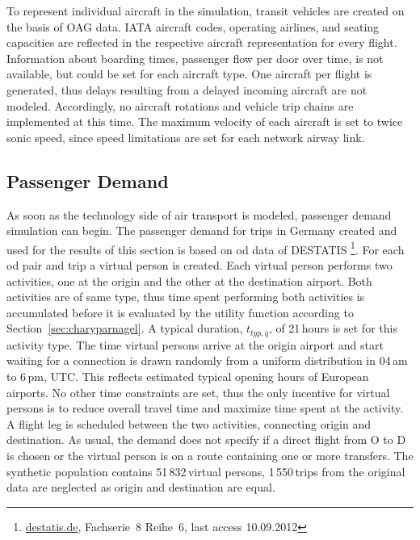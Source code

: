 To represent individual aircraft in the simulation, transit vehicles are created on the basis of OAG data. 
IATA aircraft codes, operating airlines, and seating capacities are reflected in the respective aircraft representation for every flight. 
Information about boarding times, \ie passenger flow per door over time, is not available, but could be set for each aircraft type. 
One aircraft per flight is generated, thus delays resulting from a delayed incoming aircraft are not modeled.
Accordingly, no aircraft rotations and vehicle trip chains are implemented at this time. 
The maximum velocity of each aircraft is set to twice sonic speed, since speed limitations are set for each network airway link. 

\subsection{Passenger Demand}
As soon as the technology side of air transport is modeled, passenger demand simulation can begin. 
The passenger demand for trips in Germany created and used for the results of this section is based on \gls{od} data of DESTATIS 
\footnote{\url{destatis.de}, Fachserie~8 Reihe~6, last access 10.09.2012}.
% 
For each \gls{od} pair and trip a virtual person is created.
Each virtual person performs two activities, one at the origin and the other at the destination airport. 
Both activities are of same type, thus time spent performing both activities is accumulated before it is evaluated by the utility function according to Section~\ref{sec:charyparnagel}. %
A typical duration, $t_{typ,q}$, of 21\,hours is set for this activity type. 
The time virtual persons arrive at the origin airport and start waiting for a connection is drawn randomly from a uniform distribution in 04\,am to 6\,pm, UTC. 
This reflects estimated typical opening hours of European airports.
No other time constraints are set, thus the only incentive for virtual persons is to reduce overall travel time and maximize time spent at the activity. 
A flight leg is scheduled between the two activities, connecting origin and destination.
As usual, the demand does not specify if a direct flight from O to D is chosen or the virtual person is on a route containing one or more transfers.
The synthetic population contains 51\,832\,virtual persons, 1\,550\,trips from the original data are neglected as origin and destination are equal.

